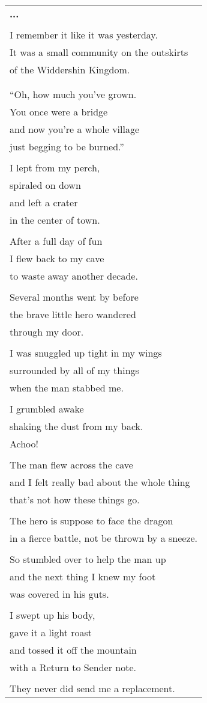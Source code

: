 \documentclass{article}
\begin{document}
\begin{center}
\begin{tabular}{l}
\textbf{...} \\
\\
I remember it like it was yesterday. \\
It was a small community on the outskirts \\
of the Widdershin Kingdom. \\
\\
\\
``Oh, how much you've grown. \\
You once were a bridge \\
and now you're a whole village \\
just begging to be burned.'' \\
\\
I lept from my perch, \\
spiraled on down \\
and left a crater \\
in the center of town. \\
\\
After a full day of fun \\
I flew back to my cave \\
to waste away another decade. \\
\\
Several months went by before \\
the brave little hero wandered \\
through my door. \\
\\
I was snuggled up tight in my wings \\
surrounded by all of my things \\
when the man stabbed me. \\
\\
I grumbled awake \\
shaking the dust from my back. \\
Achoo! \\
\\
The man flew across the cave \\
and I felt really bad about the whole thing \\
that's not how these things go. \\
\\
The hero is suppose to face the dragon \\
in a fierce battle, not be thrown by a sneeze. \\
\\
So stumbled over to help the man up \\
and the next thing I knew my foot \\
was covered in his guts. \\
\\
I swept up his body, \\
gave it a light roast \\
and tossed it off the mountain \\
with a Return to Sender note. \\
\\
They never did send me a replacement.
\\
\end{tabular}
\end{center}
\end{document}
